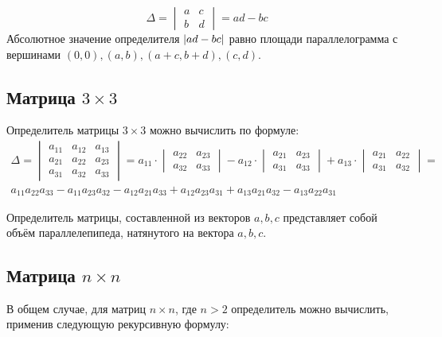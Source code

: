 \documentclass[12pt]{report}
\DeclarePairedDelimiter\abs{\lvert}{\rvert}
\begin{document}
    \begin{equation}
        \label{eq:det_2x2}
        \Delta = \begin{vmatrix}
                     a & c \\
                     b & d
        \end{vmatrix} = ad - bc
    \end{equation}
    Абсолютное значение определителя $\abs{ad - bc}$ равно площади параллелограмма с вершинами
    $(0, 0), (a, b), (a + c, b + d), (c, d)$.

    \subsection{Матрица $3 \times 3$}
    Определитель матрицы $3 \times 3$ можно вычислить по формуле:
    \begin{multline}
        \label{eq:det_3x3}
        \Delta = \begin{vmatrix}
                     a_{11} & a_{12} & a_{13} \\
                     a_{21} & a_{22} & a_{23} \\
                     a_{31} & a_{32} & a_{33}
        \end{vmatrix} =
        a_{11} \cdot \begin{vmatrix}
                         a_{22} & a_{23} \\
                         a_{32} & a_{33}
        \end{vmatrix}
        -
        a_{12} \cdot \begin{vmatrix}
                         a_{21} & a_{23} \\
                         a_{31} & a_{33}
        \end{vmatrix}
        +
        a_{13} \cdot \begin{vmatrix}
                         a_{21} & a_{22} \\
                         a_{31} & a_{32}
        \end{vmatrix}
        = \\
        a_{11}a_{22}a_{33} - a_{11}a_{23}a_{32} - a_{12}a_{21}a_{33} +
        a_{12}a_{23}a_{31} + a_{13}a_{21}a_{32} - a_{13}a_{22}a_{31}
    \end{multline}

    Определитель матрицы, составленной из векторов $a, b, c$ представляет
    собой объём параллелепипеда, натянутого на вектора $a, b, c$.

    \subsection{Матрица $n \times n$}
    В общем случае, для матриц $n \times n$, где $n > 2$ определитель можно вычислить,
    применив следующую рекурсивную формулу:
\end{document}
